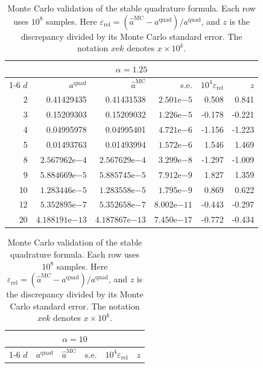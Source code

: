 \documentclass[a4paper,fleqn]{cas-dc}
\theoremstyle{definition}
\theoremstyle{remark}
\newcommand{\0}{\mathbf{0}}
\begin{document}
\begin{table}[pos=htbp]
\centering
\caption{Monte Carlo validation of the stable quadrature formula. Each row
uses $10^8$ samples. Here
$\varepsilon_{\mathrm{rel}}=(\widehat a^{\mathrm{MC}}-a^{\mathrm{quad}})/
a^{\mathrm{quad}}$, and $z$ is the discrepancy divided by its Monte Carlo
standard error. The notation $x\mathrm{e}k$ denotes $x\times10^k$.}
\label{tab:mc-validation}
\begingroup
\scriptsize
\setlength{\tabcolsep}{2.15pt}
\renewcommand{\arraystretch}{1.08}
\begin{minipage}[t]{0.495\linewidth}
\centering
\begin{tabular}{@{}rrrrrr@{}}
\toprule
\multicolumn{6}{c}{$\alpha=1.25$}\\
\cmidrule(lr){1-6}
$d$ & $a^{\mathrm{quad}}$ & $\widehat a^{\mathrm{MC}}$ & s.e. &
$10^4\varepsilon_{\mathrm{rel}}$ & $z$\\
\midrule
 2 & 0.41429435 & 0.41431538 & $2.501\mathrm{e}{-5}$  &  0.508 &  0.841\\
 3 & 0.15209303 & 0.15209032 & $1.226\mathrm{e}{-5}$  & -0.178 & -0.221\\
 4 & 0.04995978 & 0.04995401 & $4.721\mathrm{e}{-6}$  & -1.156 & -1.223\\
 5 & 0.01493763 & 0.01493994 & $1.572\mathrm{e}{-6}$  &  1.546 &  1.469\\
 8 & $2.567962\mathrm{e}{-4}$ & $2.567629\mathrm{e}{-4}$ & $3.299\mathrm{e}{-8}$  & -1.297 & -1.009\\
 9 & $5.884669\mathrm{e}{-5}$ & $5.885745\mathrm{e}{-5}$ & $7.912\mathrm{e}{-9}$  &  1.827 &  1.359\\
10 & $1.283446\mathrm{e}{-5}$ & $1.283558\mathrm{e}{-5}$ & $1.795\mathrm{e}{-9}$  &  0.869 &  0.622\\
12 & $5.352895\mathrm{e}{-7}$ & $5.352658\mathrm{e}{-7}$ & $8.002\mathrm{e}{-11}$ & -0.443 & -0.297\\
20 & $4.188191\mathrm{e}{-13}$& $4.187867\mathrm{e}{-13}$& $7.450\mathrm{e}{-17}$ & -0.772 & -0.434\\
\bottomrule
\end{tabular}
\end{minipage}%
\hfill
\begin{minipage}[t]{0.495\linewidth}
\centering
\begin{tabular}{@{}rrrrrr@{}}
\toprule
\multicolumn{6}{c}{$\alpha=10$}\\
\cmidrule(lr){1-6}
$d$ & $a^{\mathrm{quad}}$ & $\widehat a^{\mathrm{MC}}$ & s.e. &
$10^4\varepsilon_{\mathrm{rel}}$ & $z$\\

\end{tabular}
\end{minipage}
\end{table}
\end{document}
